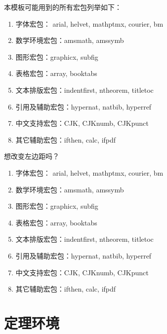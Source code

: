 本模板可能用到的所有宏包列举如下：
\begin{enumerate}
\item 字体宏包： arial, helvet, mathptmx, courier, bm
\item 数学环境宏包：amsmath, amssymb
\item 图形宏包：graphicx, subfig
\item 表格宏包：array, booktabs
\item 文本排版宏包：indentfirst, ntheorem, titletoc
\item 引用及辅助宏包：hypernat, natbib, hyperref
\item 中文支持宏包：CJK, CJKnumb, CJKpunct
\item 其它辅助宏包：ifthen, calc, ifpdf
\end{enumerate}

想改变左边距吗？
\begin{enumerate}[\setlength{\itemindent}{5em}]
\item 字体宏包： arial, helvet, mathptmx, courier, bm
\item 数学环境宏包：amsmath, amssymb
\item 图形宏包：graphicx, subfig
\item 表格宏包：array, booktabs
\item 文本排版宏包：indentfirst, ntheorem, titletoc
\item 引用及辅助宏包：hypernat, natbib, hyperref
\item 中文支持宏包：CJK, CJKnumb, CJKpunct
\item 其它辅助宏包：ifthen, calc, ifpdf
\end{enumerate}


\section{定理环境}
\label{sec:theorem}

